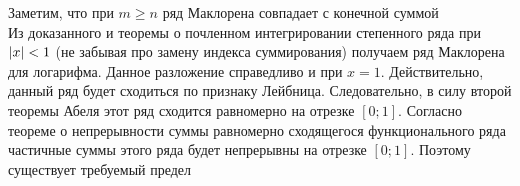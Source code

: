 Заметим, что при $m \geq n$ ряд Маклорена совпадает с конечной суммой \\

Из доказанного и теоремы о почленном интегрировании степенного ряда при $\abs{x} < 1$ (не забывая про замену
индекса суммирования) получаем ряд Маклорена для логарифма.
Данное разложение справедливо и при $x = 1$.
Действительно, данный ряд будет сходиться по признаку Лейбница.
Следовательно, в силу второй теоремы Абеля этот ряд сходится равномерно на отрезке $[0; 1]$.
Согласно теореме о непрерывности суммы равномерно сходящегося функционального ряда частичные суммы этого ряда будет
непрерывны на отрезке $[0; 1]$.
Поэтому существует требуемый предел